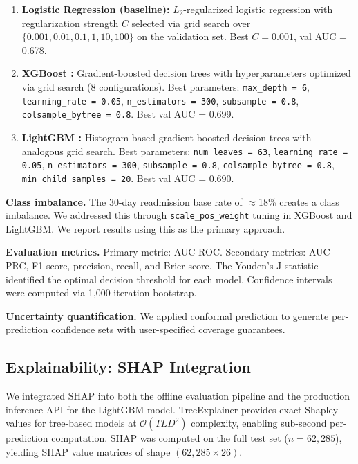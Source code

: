\documentclass[11pt,letterpaper]{article}
\begin{document}
\begin{enumerate}[leftmargin=1.5em,itemsep=0.3em]
  \item \textbf{Logistic Regression (baseline):} $L_2$-regularized logistic regression with regularization strength $C$ selected via grid search over $\{0.001, 0.01, 0.1, 1, 10, 100\}$ on the validation set. Best $C = 0.001$, val AUC = 0.678.

  \item \textbf{XGBoost \citep{chen2016xgboost}:} Gradient-boosted decision trees with hyperparameters optimized via grid search (8 configurations). Best parameters: \texttt{max\_depth = 6}, \texttt{learning\_rate = 0.05}, \texttt{n\_estimators = 300}, \texttt{subsample = 0.8}, \texttt{colsample\_bytree = 0.8}. Best val AUC = 0.699.

  \item \textbf{LightGBM \citep{ke2017lightgbm}:} Histogram-based gradient-boosted decision trees with analogous grid search. Best parameters: \texttt{num\_leaves = 63}, \texttt{learning\_rate = 0.05}, \texttt{n\_estimators = 300}, \texttt{subsample = 0.8}, \texttt{colsample\_bytree = 0.8}, \texttt{min\_child\_samples = 20}. Best val AUC = 0.690.
\end{enumerate}

\textbf{Class imbalance.} The 30-day readmission base rate of $\approx$18\% creates a class imbalance. We addressed this through \texttt{scale\_pos\_weight} tuning in XGBoost and LightGBM. We report results using this as the primary approach.

\textbf{Evaluation metrics.} Primary metric: AUC-ROC. Secondary metrics: AUC-PRC, F1 score, precision, recall, and Brier score. The Youden's J statistic identified the optimal decision threshold for each model. Confidence intervals were computed via 1,000-iteration bootstrap.

\textbf{Uncertainty quantification.} We applied conformal prediction \citep{angelopoulos2021gentle} to generate per-prediction confidence sets with user-specified coverage guarantees.

\subsection{Explainability: SHAP Integration}
\label{sec:shap}

We integrated SHAP \citep{lundberg2017unified,lundberg2020local} into both the offline evaluation pipeline and the production inference API for the LightGBM model. TreeExplainer \citep{lundberg2020local} provides exact Shapley values for tree-based models at $\mathcal{O}(TLD^2)$ complexity, enabling sub-second per-prediction computation. SHAP was computed on the full test set ($n = 62{,}285$), yielding SHAP value matrices of shape $(62{,}285 \times 26)$.
\end{document}
